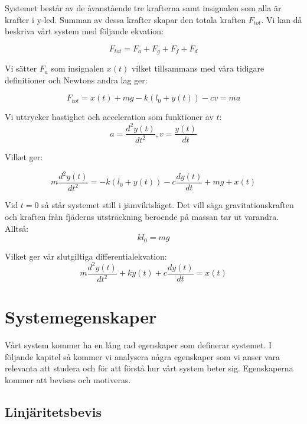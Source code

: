 \documentclass[10pt,a4paper]{article}
\begin{document}
Systemet består av de åvanstående tre krafterna samt insignalen som alla är krafter i y-led. Summan av dessa krafter skapar den totala kraften $F_{tot}$. Vi kan då beskriva vårt system med följande ekvation:

\begin{equation}
F_{tot} = F_a + F_g + F_f + F_d
\end{equation}

Vi sätter $F_a$ som insignalen $x(t)$ vilket tillsammans med våra tidigare definitioner och Newtons andra lag \cite[s.~138]{randall2008} ger:

\begin{equation}
F_{tot} = x(t) + mg - k(l_0+y(t)) - cv = ma
\end{equation}

Vi uttrycker hastighet och acceleration som funktioner av $t$:
\begin{equation}
a = \frac{d^2y(t)}{dt^2} , v = \frac{y(t)}{dt}
\end{equation}

\newpage

Vilket ger:

\begin{equation}
 m\frac{d^2y(t)}{dt^2} =  -k(l_0 + y(t)) -c\frac{dy(t)}{dt} + mg +  x(t)
\end{equation}

Vid $t = 0$ så står systemet still i jämviktsläget. Det vill säga gravitationskraften och kraften från fjäderns utsträckning beroende på massan tar ut varandra. Alltså:
\begin{equation}
k  l_0 = mg
\end{equation}

Vilket ger vår slutgiltiga differentialekvation:
\begin{equation}
 m\frac{d^2y(t)}{dt^2} + k  y(t) + c\frac{dy(t)}{dt} = x(t)
\end{equation}


\section{Systemegenskaper}

Vårt system kommer ha en lång rad egenskaper som definerar systemet. I följande kapitel så kommer vi analysera några egenskaper som vi anser vara relevanta att studera och för att förstå hur vårt system beter sig. Egenskaperna kommer att bevisas och motiveras.

\subsection{Linjäritetsbevis}
\end{document}
